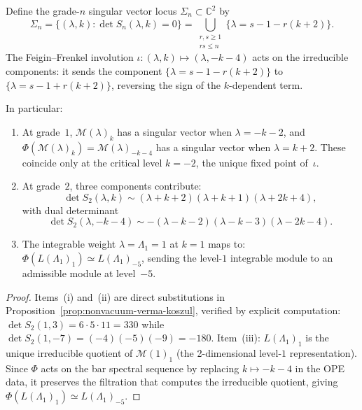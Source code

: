 \begin{corollary}
\label{cor:singular-vector-symmetry}
Define the grade-$n$ singular vector locus
$\Sigma_n \subset \mathbb{C}^2$ by
\[
\Sigma_n = \bigl\{(\lambda, k) :
\det S_n(\lambda, k) = 0 \bigr\}
= \bigcup_{\substack{r,s \geq 1 \\ rs \leq n}}
\bigl\{\lambda = s - 1 - r(k+2)\bigr\}.
\]
The Feigin--Frenkel involution
$\iota\colon (\lambda, k) \mapsto (\lambda, -k-4)$ acts on
the irreducible components: it sends the component
$\{\lambda = s - 1 - r(k+2)\}$ to
$\{\lambda = s - 1 + r(k+2)\}$, reversing the sign of the
$k$-dependent term.

In particular:
\begin{enumerate}[label=\textup{(\roman*)}]
\item At grade~$1$, $\mathcal{M}(\lambda)_k$ has a singular
  vector when $\lambda = -k - 2$, and
  $\Phi(\mathcal{M}(\lambda)_k) = \mathcal{M}(\lambda)_{-k-4}$
  has a singular vector when $\lambda = k + 2$.  These coincide
  only at the critical level $k = -2$, the unique fixed point
  of~$\iota$.
\item At grade~$2$, three components contribute:
  \[
  \det S_2(\lambda, k) \sim
  (\lambda + k + 2)(\lambda + k + 1)(\lambda + 2k + 4),
  \]
  with dual determinant
  \[
  \det S_2(\lambda, -k\!-\!4) \sim
  -(\lambda - k - 2)(\lambda - k - 3)(\lambda - 2k - 4).
  \]
\item The integrable weight $\lambda = \Lambda_1 = 1$ at $k = 1$
  maps to:
  $\Phi(L(\Lambda_1)_1) \simeq L(\Lambda_1)_{-5}$,
  sending the level-$1$ integrable module to an admissible
  module at level~$-5$.
\end{enumerate}
\end{corollary}

\begin{proof}
Items~(i) and~(ii) are direct substitutions in
Proposition~\ref{prop:nonvacuum-verma-koszul}, verified
by explicit computation:
$\det S_2(1, 3) = 6 \cdot 5 \cdot 11 = 330$ while
$\det S_2(1, -7) = (-4)(-5)(-9) = -180$.
Item~(iii):
$L(\Lambda_1)_1$ is the unique irreducible quotient of
$\mathcal{M}(1)_1$ (the 2-dimensional level-$1$ representation).
Since $\Phi$ acts on the bar spectral sequence by replacing
$k \mapsto -k-4$ in the OPE data, it preserves the filtration
that computes the irreducible quotient, giving
$\Phi(L(\Lambda_1)_1) \simeq L(\Lambda_1)_{-5}$.
\end{proof}

